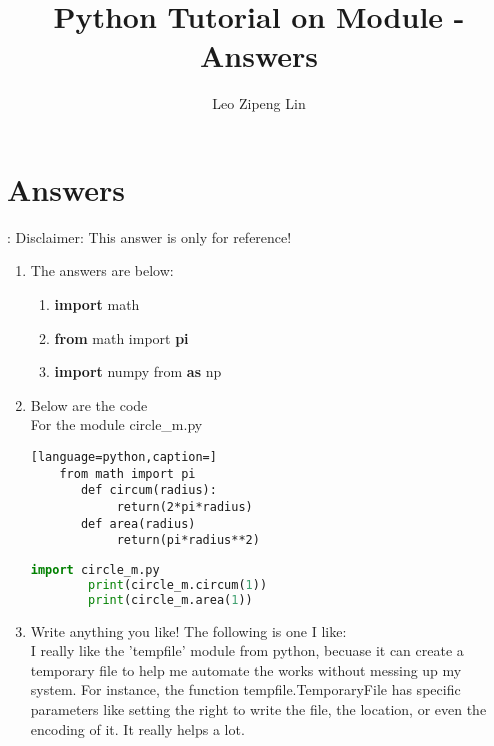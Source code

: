 \documentclass[12pt]{article}
\title{Python Tutorial on Module - Answers}
\author{Leo Zipeng Lin}
\begin{document}
\maketitle
\section{Answers}:
Disclaimer: This answer is only for reference!
\begin{enumerate}
	\item The answers are below:
		\begin{enumerate}
			\item \textbf{import} math	
			\item \textbf{from} math import \textbf{pi}
			\item \textbf{import} numpy from \textbf{as} np 
		\end{enumerate}
	\item Below are the code
	\\ For the module circle\_m.py
	\begin{lstlisting}[language=python,caption=]
	from math import pi
	   def circum(radius):
		    return(2*pi*radius)
	   def area(radius)
		    return(pi*radius**2)
	\end{lstlisting}
	\begin{lstlisting}[language=python,caption=Pt.2]
		import circle_m.py
		print(circle_m.circum(1))
		print(circle_m.area(1))
	\end{lstlisting}

	\item Write anything you like! The following is one I like:
		\\ I really like the 'tempfile' module from python, becuase it can create a temporary file to help me automate the works without messing up my system. For instance, the function tempfile.TemporaryFile has specific parameters like setting the right to write the file, the location, or even the encoding of it. It really helps a lot.
\end{enumerate}
\end{document}
